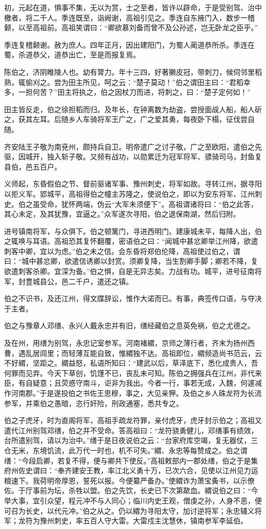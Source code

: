 \documentclass[12pt,UTF8]{ctexbook}
\begin{document}
初，元起在道，惧事不集，无以为赏，士之至者，皆许以辟命，于是受别驾、治中檄者，将二千人。季连既至，诣阙谢，高祖引见之。季连自东掖门入，数步一稽颡，以至高祖前。高祖笑谓曰：“卿欲慕刘备而曾不及公孙述，岂无卧龙之臣乎。”

季连复稽颡谢。赦为庶人。四年正月，因出建阳门，为蜀人蔺道恭所杀。季连在蜀，杀道恭父，道恭出亡，至是而报复焉。

陈伯之，济阴睢陵人也。幼有膂力。年十三四，好著獭皮冠，带刺刀，候伺邻里稻熟，辄偷刈之。尝为田主所见，呵之云：“楚子莫动！”伯之谓田主曰：“君稻幸多，一担何苦？”田主将执之，伯之因杖刀而进，将刺之，曰：“楚子定何如！”

田主皆反走，伯之徐担稻而归。及年长，在钟离数为劫盗，尝授面觇人船，船人斫之，获其左耳。后随乡人车骑将军王广之，广之爱其勇，每夜卧下榻，征伐尝自随。

齐安陆王子敬为南兗州，颇持兵自卫。明帝遣广之讨子敬，广之至欧阳，遣伯之先驱，因城开，独入斩子敬。又频有战功，以勋累迁为冠军将军、骠骑司马，封鱼复县伯，邑五百户。

义师起，东昏假伯之节、督前驱诸军事、豫州刺史，将军如故。寻转江州，据寻阳以拒义军。郢城平，高祖得伯之幢主苏隆之，使说伯之，即以为安东将军、江州刺史。伯之虽受命，犹怀两端，伪云“大军未须便下”。高祖谓诸将曰：“伯之此答，其心未定，及其犹豫，宜逼之。”众军遂次寻阳，伯之退保南湖，然后归附。

进号镇南将军，与众俱下。伯之顿篱门，寻进西明门。建康城未平，每降人出，伯之辄唤与耳语。高祖恐其复怀翻覆，密语伯之曰：“闻城中甚忿卿举江州降，欲遣刺客中卿，宜以为虑。”伯之未之信。会东昏将郑伯伦降，高祖使过伯之，谓曰：“城中甚忿卿，欲遣信诱卿以封赏。须卿复降，当生割卿手脚；卿若不降，复欲遣刺客杀卿。宜深为备。”伯之惧，自是无异志矣。力战有功。城平，进号征南将军，封豊城县公，邑二千户，遣还之镇。

伯之不识书，及还江州，得文牒辞讼，惟作大诺而已。有事，典签传口语，与夺决于主者。

伯之与豫章人邓缮、永兴人戴永忠并有旧，缮经藏伯之息英免祸，伯之尤德之。

及在州，用缮为别驾，永忠记室参军。河南褚緭，京师之薄行者，齐末为扬州西曹，遇乱居闾里；而轻薄互能自致，惟緭独不达。高祖即位，緭频造尚书范云，云不好緭，坚距之。緭益怒，私语所知曰：“建武以后，草泽底下，悉化成贵人，吾何罪而见弃。今天下草创，饥馑不已，丧乱未可知。陈伯之拥强兵在江州，非代来臣，有自疑意；且荧惑守南斗，讵非为我出。今者一行，事若无成，入魏，何遽减作河南郡。”于是遂投伯之书佐王思穆，事之，大见亲狎。及伯之乡人硃龙符为长流参军，并乘伯之愚暗，恣行奸险，刑政通塞，悉共专之。

伯之子虎牙，时为直阁将军，高祖手疏龙符罪，亲付虎牙，虎牙封示伯之；高祖又遣代江州别驾邓缮，伯之并不受命。答高祖曰：“龙符骁勇健儿，邓缮事有绩效，台所遣别驾，请以为治中。”缮于是日夜说伯之云：“台家府库空竭，复无器仗，三仓无米，东境饥流，此万代一时也，机不可失。”緭、永忠等每赞成之。伯之谓缮：“今段启卿，若复不得，便与卿共下使反。”高祖敕部内一郡处缮，伯之于是集府州佐史谓曰：“奉齐建安王教，率江北义勇十万，已次六合，见使以江州见力运粮速下。我荷明帝厚恩，誓死以报。今便纂严备办。”使緭诈为萧宝夤书，以示僚佐。于厅事前为坛，杀牲以盟。伯之先饮，长史已下次第歃血。緭说伯之曰：“今举大事，宜引众望，程元冲不与人同心；临川内史王观，僧虔之孙，人身不恶，便可召为长史，以代元冲。”伯之从之。仍以緭为寻阳太守，加讨逆将军；永忠辅义将军；龙符为豫州刺史，率五百人守大雷。大雷戍主沈慧休，镇南参军李延伯。
\end{document}
